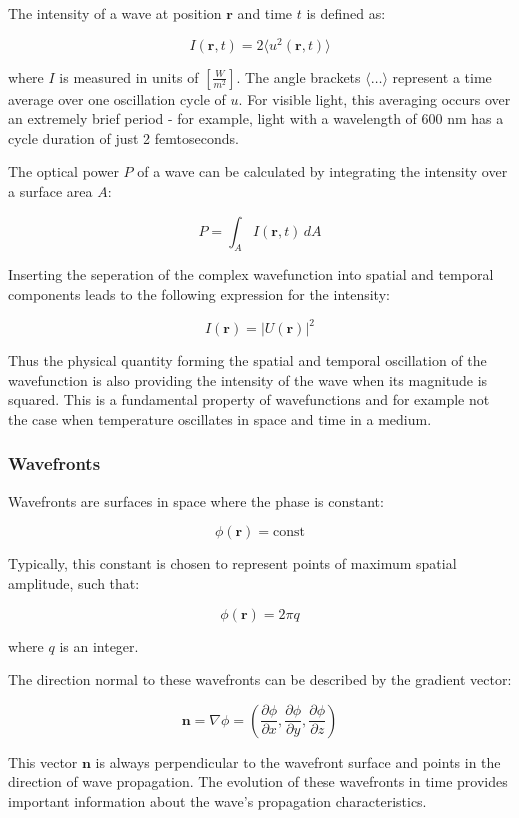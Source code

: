 \documentclass[
  a4paper,
]{book}
\begin{document}
The intensity of a wave at position \(\mathbf{r}\) and time \(t\) is
defined as:

\[
I(\mathbf{r},t)=2\langle u^2(\mathbf{r},t)\rangle
\]

where \(I\) is measured in units of \(\left[\frac{W}{m^2}\right]\). The
angle brackets \(\langle \ldots \rangle\) represent a time average over
one oscillation cycle of \(u\). For visible light, this averaging occurs
over an extremely brief period - for example, light with a wavelength of
600 nm has a cycle duration of just 2 femtoseconds.

The optical power \(P\) of a wave can be calculated by integrating the
intensity over a surface area \(A\):

\[
P=\int_A I(\mathbf{r},t) \, dA
\]

Inserting the seperation of the complex wavefunction into spatial and
temporal components leads to the following expression for the intensity:

\[
I(\mathbf{r})=|U(\mathbf{r})|^2
\]

Thus the physical quantity forming the spatial and temporal oscillation
of the wavefunction is also providing the intensity of the wave when its
magnitude is squared. This is a fundamental property of wavefunctions
and for example not the case when temperature oscillates in space and
time in a medium.

\subsubsection{Wavefronts}\label{wavefronts}

Wavefronts are surfaces in space where the phase is constant:

\[
\phi(\mathbf{r})=\text{const}
\]

Typically, this constant is chosen to represent points of maximum
spatial amplitude, such that:

\[
\phi(\mathbf{r})=2\pi q
\]

where \(q\) is an integer.

The direction normal to these wavefronts can be described by the
gradient vector:

\[
\mathbf{n}=\nabla\phi=\left(\frac{\partial \phi}{\partial x},\frac{\partial \phi}{\partial y},\frac{\partial \phi}{\partial z}\right)
\]

This vector \(\mathbf{n}\) is always perpendicular to the wavefront
surface and points in the direction of wave propagation. The evolution
of these wavefronts in time provides important information about the
wave's propagation characteristics.
\end{document}
